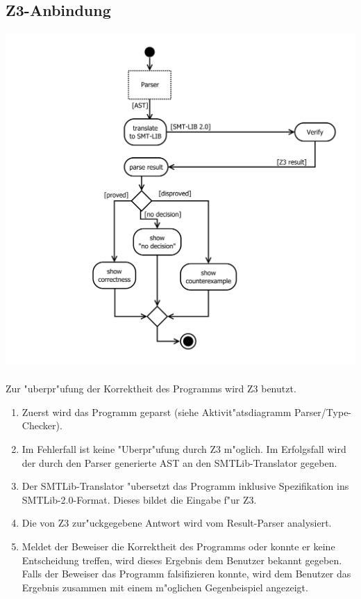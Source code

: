 \documentclass[10pt,a4paper,titlepage]{article}
\begin{document}
\subsection{Z3-Anbindung}

\includegraphics[scale=0.5]{images/AktivitaetSMTTranslator.pdf}\\\\
Zur "uberpr"ufung der Korrektheit des Programms wird Z3 benutzt. 
\begin{enumerate}
\item Zuerst wird das Programm geparst (siehe Aktivit"atsdiagramm Parser/Type-Checker).
\item Im Fehlerfall ist keine "Uberpr"ufung durch Z3 m"oglich. Im Erfolgsfall wird der durch den Parser generierte AST an den SMTLib-Translator gegeben.
\item Der SMTLib-Translator "ubersetzt das Programm inklusive Spezifikation ins SMTLib-2.0-Format. Dieses bildet die Eingabe f"ur Z3.
\item Die von Z3 zur"uckgegebene Antwort wird vom Result-Parser analysiert.
\item Meldet der Beweiser die Korrektheit des Programms oder konnte er keine Entscheidung treffen, wird dieses Ergebnis dem Benutzer bekannt gegeben. Falls der Beweiser das Programm falsifizieren konnte, wird dem Benutzer das Ergebnis zusammen mit einem m"oglichen Gegenbeispiel angezeigt.
\end{enumerate}
\end{document}
